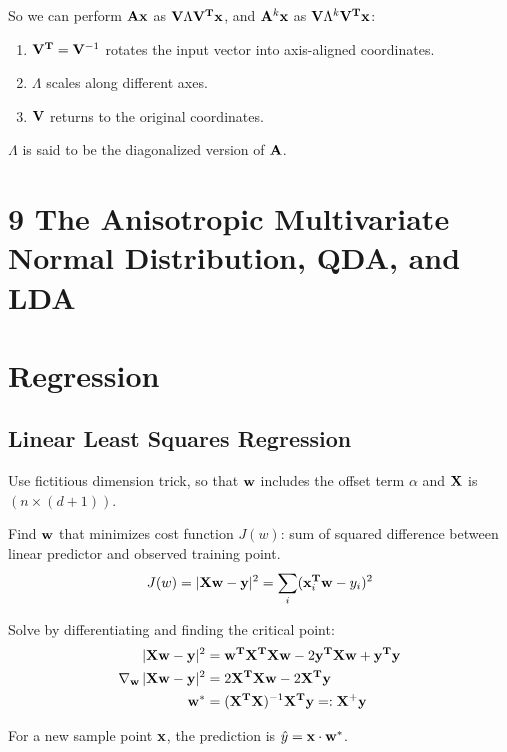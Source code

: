 \documentclass[12pt]{article}
\begin{document}
So we can perform $\mathbf A\mathbf x$ as $\mathbf V\Lambda\mathbf V^{\mathbf{T}}\mathbf x$, and $\mathbf A^k\mathbf x$ as
$\mathbf V\Lambda^k\mathbf V^{\mathbf{T}}\mathbf x$:

\begin{enumerate}
\item $\mathbf V^{\mathbf{T}} = \mathbf V^{-1}$ rotates the input vector into axis-aligned coordinates.
\item $\Lambda$ scales along different axes.
\item $\mathbf V$ returns to the original coordinates.
\end{enumerate}

$\Lambda$ is said to be the diagonalized version of $\mathbf A$.
\section*{9 The Anisotropic Multivariate Normal Distribution, QDA, and LDA}

\newpage
\section*{Regression}
\subsection*{Linear Least Squares Regression}
Use fictitious dimension trick, so that $\mathbf w$ includes the offset term $\alpha$
and $\mathbf X$ is $(n \times (d + 1))$.
\\
\begin{mdframed}
Find $\mathbf w$ that minimizes cost function $J(w)$: sum of squared difference between
linear predictor and observed training point.
\begin{align*}
  J(w) = |\mathbf X \mathbf w - \mathbf y|^2 = \sum_i (\mathbf x_i^{\mathbf{T}}\mathbf w - y_i)^2
\end{align*}
\end{mdframed}

Solve by differentiating and finding the critical point:
\begin{align*}
  |\mathbf X \mathbf w - \mathbf y|^2          &= \mathbf w^{\mathbf{T}}\mathbf X^{\mathbf{T}}\mathbf X\mathbf w - 2\mathbf y^{\mathbf{T}}\mathbf X\mathbf w + \mathbf y^{\mathbf{T}}\mathbf y \\
  \operatorname{\nabla}_\mathbf w |\mathbf X \mathbf w - \mathbf y|^2 &= 2 \mathbf X^{\mathbf{T}}\mathbf X\mathbf w - 2\mathbf X^{\mathbf{T}}\mathbf y \\
  \mathbf w^*                    &= (\mathbf X^{\mathbf{T}}\mathbf X)^{-1}\mathbf X^{\mathbf{T}}\mathbf y =: \mathbf X^+\mathbf y
\end{align*}
\begin{mdframed}
For a new sample point $\mathbf x$, the prediction is $\hat y = \mathbf x \cdot \mathbf w^*$.
\end{mdframed}
\end{document}
